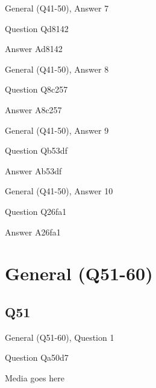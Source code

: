 \documentclass[11pt]{beamer}
\begin{document}
\begin{frame}[t]{General (Q41-50), Answer 7}
\vspace{2em}
\begin{block}{Question}
Qd8142
\end{block}
\pause{}
\begin{block}{Answer}
Ad8142
\end{block}
\end{frame}
    

\begin{frame}[t]{General (Q41-50), Answer 8}
\vspace{2em}
\begin{block}{Question}
Q8c257
\end{block}
\pause{}
\begin{block}{Answer}
A8c257
\end{block}
\end{frame}
    

\begin{frame}[t]{General (Q41-50), Answer 9}
\vspace{2em}
\begin{block}{Question}
Qb53df
\end{block}
\pause{}
\begin{block}{Answer}
Ab53df
\end{block}
\end{frame}
    

\begin{frame}[t]{General (Q41-50), Answer 10}
\vspace{2em}
\begin{block}{Question}
Q26fa1
\end{block}
\pause{}
\begin{block}{Answer}
A26fa1
\end{block}
\end{frame}
    

\section{General (Q51-60)}
    

\subsection*{Q51}
\begin{frame}[t]{General (Q51-60), Question 1}
\vspace{2em}
\begin{block}{Question}
Qa50d7
\end{block}
\begin{center}
Media goes here
\end{center}
\end{frame}
    
\end{document}
